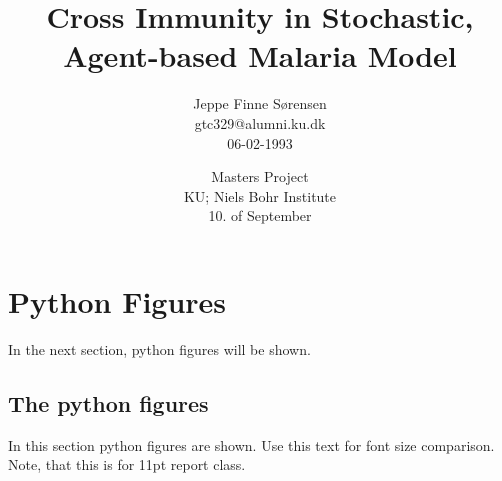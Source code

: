 \documentclass[a4paper,11pt]{report} %
\numberwithin{equation}{section}
\begin{document}
\printlength{\textwidth}

\title{Cross Immunity in Stochastic, Agent-based Malaria Model}
\author{Jeppe Finne Sørensen \\ gtc329@alumni.ku.dk \\ 06-02-1993}
\date{Masters Project \\ KU; Niels Bohr Institute \\ 10. of September}

\maketitle
\thispagestyle{empty}

\newpage	

\chapter{Python Figures}

In the next section, python figures will be shown. 

\section{The python figures}

In this section python figures are shown. Use this text for font size comparison. Note, that this is for 11pt report class. 
\end{document}
